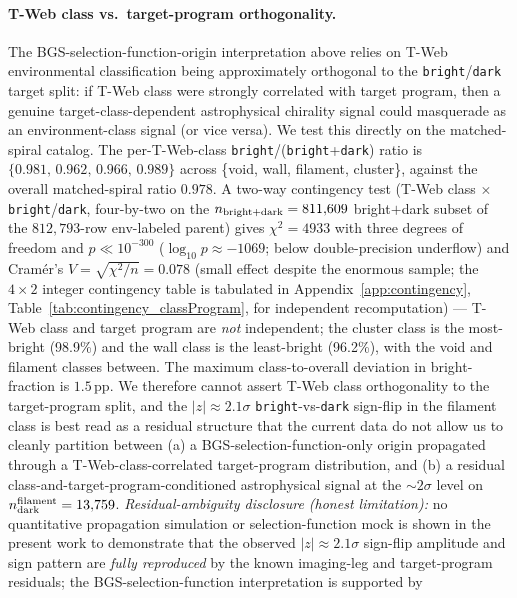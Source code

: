 \documentclass[twocolumn,linenumbers]{aastex702}
\begin{document}
\paragraph{T-Web class vs.\ target-program orthogonality.} The BGS-selection-function-origin interpretation
above relies on T-Web environmental classification being approximately
orthogonal to the \texttt{bright}/\texttt{dark} target split: if
T-Web class were strongly correlated with target program, then a
genuine target-class-dependent astrophysical chirality signal could
masquerade as an environment-class signal (or vice versa). We test
this directly on the matched-spiral catalog. The per-T-Web-class
\texttt{bright}/(\texttt{bright}+\texttt{dark}) ratio is
$\{0.981,\,0.962,\,0.966,\,0.989\}$ across
\{void, wall, filament, cluster\}, against the overall
matched-spiral ratio $0.978$. A two-way contingency test
(T-Web class $\times$ \texttt{bright}/\texttt{dark}, four-by-two
on the $n_{\rm bright+dark} = 811{,}609$ bright$+$dark subset of the
$812{,}793$-row env-labeled parent) gives
$\chi^{2} = 4933$ with three degrees of freedom and
$p \ll 10^{-300}$ ($\log_{10} p \approx -1069$; below double-precision
underflow) and Cram\'er's $V = \sqrt{\chi^2/n} = 0.078$ (small
effect despite the enormous sample; the $4{\times}2$ integer
contingency table is tabulated in Appendix~\ref{app:contingency},
Table~\ref{tab:contingency_classProgram}, for independent
recomputation) ---
T-Web class and target program are \emph{not} independent;
the cluster class is the most-bright (98.9\%) and the wall class is the
least-bright (96.2\%), with the void and filament classes between.
The maximum class-to-overall deviation in bright-fraction is $1.5$\,pp.
We therefore cannot assert
T-Web class orthogonality to the target-program split, and
the $|z|\!\approx\!2.1\sigma$ \texttt{bright}-vs-\texttt{dark} sign-flip
in the filament class
is best read as a residual structure that the current data do
not allow us to cleanly partition between
(a) a BGS-selection-function-only origin propagated through a
T-Web-class-correlated target-program distribution, and
(b) a residual class-and-target-program-conditioned astrophysical
signal at the $\sim\!2\sigma$ level on $n_{\rm dark}^{\rm filament}
= 13{,}759$.
\emph{Residual-ambiguity disclosure (honest limitation):} no
quantitative propagation simulation or selection-function mock is
shown in the present work to demonstrate that the observed
$|z|\!\approx\!2.1\sigma$ sign-flip amplitude and sign pattern are
\emph{fully reproduced} by the known imaging-leg and target-program
residuals; the BGS-selection-function interpretation is supported by
\end{document}
